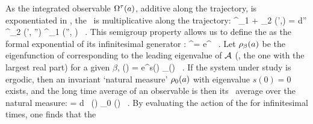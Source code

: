 As the integrated observable $\Omega^{\tau} (a)$, additive along the
trajectory, is exponentiated in , the \evOper\
is multiplicative along the trajectory:
\beq
   \Lop^{\zeit_1 + \zeit_2} (\ssp',\ssp) =
    \int d\ssp'' \Lop^{\zeit_2} (\ssp', \ssp'')
                   \Lop^{\zeit_1} (\ssp'', \ssp) \, .
   \label{eq-SemiGroupKernel}
\eeq
This semigroup property allows us to define the {\evOper} as the formal
exponential of its infinitesimal generator \Aop:
\beq
   \Lop^\zeit = e^{\Aop \zeit} \, .
   \label{eq-EvOpExp}
\eeq
Let $\rho_{\beta} (a)$ be the eigenfunction of
 corresponding to the leading eigenvalue of ${\cal A}$ (\ie, the one
with the largest real part) for a given $\beta$,
\beq
    \left[ \Lop^\zeit \rho_{\beta} \right] (\ssp)
    =
    e^{\zeit s(\beta )} \rho_{\beta}(\ssp)
    \, .
    \label{eq-EigenvalueRel}
\eeq
If the system under study is
ergodic, then an invariant `natural measure' $\rho_0(a)$ with
eigenvalue $s(0) = 0$ exists, and the long time average of an observable is
then its \statesp\ average over the natural measure:
\beq
    \langle \obser \rangle = \int d \ssp \, \obser(\ssp) \rho_0 (\ssp) \, .
    \label{e-obserAvg}
\eeq
By evaluating the action of the {\evOper}  for
infinitesimal times, one finds that the

